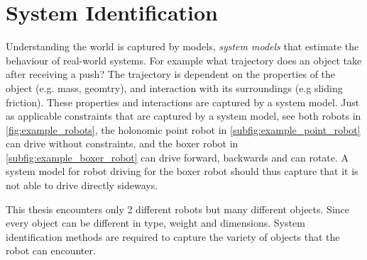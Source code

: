 \section{System Identification}%
\label{sec:sys_iden}
Understanding the world is captured by models, \textit{system models} that estimate the behaviour of real-world systems. For example what trajectory does an object take after receiving a push? The trajectory is dependent on the properties of the object (e.g. mass, geomtry), and interaction with its surroundings (e.g sliding friction). These properties and interactions are captured by a system model. Just as applicable constraints that are captured by a system model, see both robots in \cref{fig:example_robots}, the holonomic point robot in \cref{subfig:example_point_robot} can drive without constraints, and the boxer robot in \cref{subfig:example_boxer_robot} can drive forward, backwards and can rotate. A system model for robot driving for the boxer robot should thus capture that it is not able to drive directly sideways.\bs

This thesis encounters only 2 different robots but many different objects. Since every object can be different in type, weight and dimensions. System identification methods are required to capture the variety of objects that the robot can encounter.\bs

